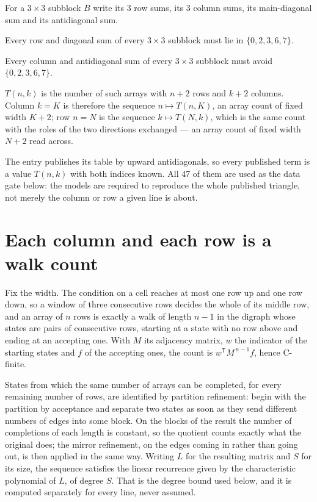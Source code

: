 \documentclass[11pt]{article}
\theoremstyle{definition}
\begin{document}
For a $3\times3$ subblock $B$ write its 3 row sums, its 3 column sums, its main-diagonal sum and its antidiagonal sum.

Every row and diagonal sum of every $3\times3$ subblock must lie in $\{0, 2, 3, 6, 7\}$.

Every column and antidiagonal sum of every $3\times3$ subblock must avoid $\{0, 2, 3, 6, 7\}$.

$T(n,k)$ is the number of such arrays with $n + 2$ rows and $k + 2$ columns. Column $k = K$ is therefore the sequence $n \mapsto T(n,K)$, an array count of fixed width $K + 2$; row $n = N$ is the sequence $k \mapsto T(N,k)$, which is the same count with the roles of the two directions exchanged --- an array count of fixed width $N + 2$ read across.

The entry publishes its table by upward antidiagonals, so every published term is a value $T(n,k)$ with both indices known. All 47 of them are used as the data gate below: the models are required to reproduce the whole published triangle, not merely the column or row a given line is about.

\section{Each column and each row is a walk count}

Fix the width. The condition on a cell reaches at most one row up and one row down, so a window of three consecutive rows decides the whole of its middle row, and an array of $n$ rows is exactly a walk of length $n-1$ in the digraph whose states are pairs of consecutive rows, starting at a state with no row above and ending at an accepting one. With $M$ its adjacency matrix, $w$ the indicator of the starting states and $f$ of the accepting ones, the count is $w^{\mathsf T}M^{\,n-1}f$, hence C-finite.

States from which the same number of arrays can be completed, for every remaining number of rows, are identified by partition refinement: begin with the partition by acceptance and separate two states as soon as they send different numbers of edges into some block. On the blocks of the result the number of completions of each length is constant, so the quotient counts exactly what the original does; the mirror refinement, on the edges coming in rather than going out, is then applied in the same way. Writing $L$ for the resulting matrix and $S$ for its size, the sequence satisfies the linear recurrence given by the characteristic polynomial of $L$, of degree $S$. That is the degree bound used below, and it is computed separately for every line, never assumed.
\end{document}
